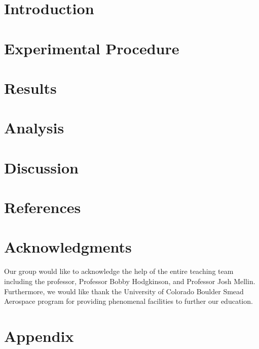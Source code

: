 \documentclass[conf]{new-aiaa}
\begin{document}
\section{Introduction}


\section{Experimental Procedure}

\section{Results}


\section{Analysis}

\section{Discussion}

\section{References}

\section{Acknowledgments}
Our group would like to acknowledge the help of the entire teaching team including the professor, Professor Bobby Hodgkinson, and Professor Josh Mellin. Furthermore, we would like thank the University of Colorado Boulder Smead Aerospace program for providing phenomenal facilities to further our education.
\section{Appendix}
\end{document}
